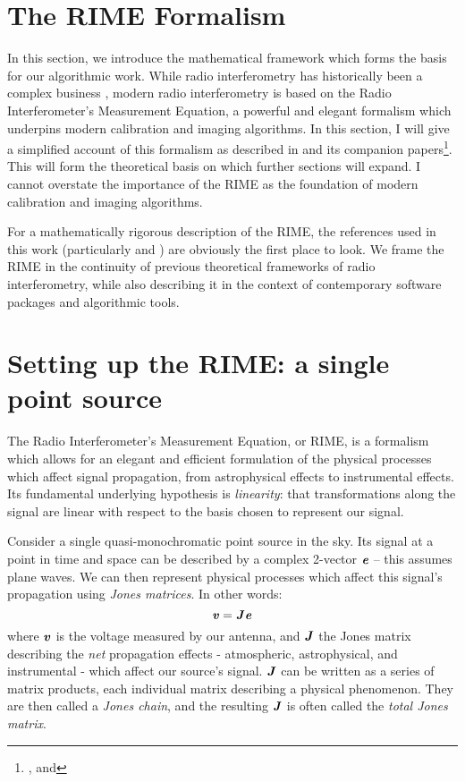 
\section{The RIME Formalism}\label{section.RIME}

\pg
In this section, we introduce the mathematical framework which forms the basis for our algorithmic work.
While radio interferometry has historically been a complex business , modern radio interferometry is based on the Radio Interferometer's Measurement Equation, a powerful and elegant formalism which underpins modern calibration and imaging algorithms. In this section, I will give a simplified account of this formalism as described in  and its companion papers\footnote{,  and }. This will form the theoretical basis on which further sections will expand. I cannot overstate the importance of the RIME as the foundation of modern calibration and imaging algorithms.

\pg
For a mathematically rigorous description of the RIME, the references used in this work (particularly  and ) are obviously the first place to look. We frame the RIME in the continuity of previous theoretical frameworks of radio interferometry, while also describing it in the context of contemporary software packages and algorithmic tools.

\section{Setting up the RIME: a single point source}
\label{section.RIME.setup}

\pg
The Radio Interferometer's Measurement Equation, or RIME, is a formalism which allows for an elegant and efficient formulation of the physical processes which affect signal propagation, from astrophysical effects to instrumental effects. Its fundamental underlying hypothesis is \emph{linearity}: that transformations along the signal are linear with respect to the basis chosen to represent our signal.

\pg
Consider a single quasi-monochromatic point source in the sky. Its signal at a point in time and space can be described by a complex 2-vector $\evector$ -- this assumes plane waves. We can then represent physical processes which affect this signal's propagation using \emph{Jones matrices}. In other words:
\begin{equation}
\volt = \Jones\evector
\end{equation}
where $\volt$ is the voltage measured by our antenna, and $\Jones$ the Jones matrix describing the \emph{net} propagation effects - atmospheric, astrophysical, and instrumental - which affect our source's signal. $\Jones$ can be written as a series of matrix products, each individual matrix describing a physical phenomenon. They are then called a \emph{Jones chain}, and the resulting $\Jones$ is often called the \emph{total Jones matrix}.

